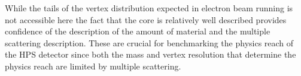 While the tails of the vertex distribution expected in electron beam running is not accessible here the 
fact that the core is relatively well described provides confidence of the description of the amount of 
material and the multiple scattering description.  These are crucial for benchmarking the physics reach of the 
HPS detector since both the mass and vertex resolution that determine the physics reach are limited by multiple scattering.

